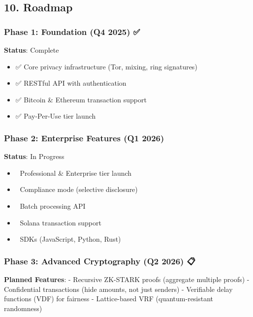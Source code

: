 \documentclass[
  11pt,
]{article}
\providecommand{\tightlist}{%
  \setlength{\itemsep}{0pt}\setlength{\parskip}{0pt}}
\begin{document}
\hypertarget{roadmap}{%
\subsection{10. Roadmap}\label{roadmap}}

\hypertarget{phase-1-foundation-q4-2025}{%
\subsubsection{Phase 1: Foundation (Q4 2025)
✅}\label{phase-1-foundation-q4-2025}}

\textbf{Status}: Complete

\begin{itemize}
\tightlist
\item
  ✅ Core privacy infrastructure (Tor, mixing, ring signatures)
\item
  ✅ RESTful API with authentication
\item
  ✅ Bitcoin \& Ethereum transaction support
\item
  ✅ Pay-Per-Use tier launch
\end{itemize}

\hypertarget{phase-2-enterprise-features-q1-2026}{%
\subsubsection{Phase 2: Enterprise Features (Q1 2026)
🔄}\label{phase-2-enterprise-features-q1-2026}}

\textbf{Status}: In Progress

\begin{itemize}
\tightlist
\item
  🔄 Professional \& Enterprise tier launch
\item
  🔄 Compliance mode (selective disclosure)
\item
  🔄 Batch processing API
\item
  🔄 Solana transaction support
\item
  🔄 SDKs (JavaScript, Python, Rust)
\end{itemize}

\hypertarget{phase-3-advanced-cryptography-q2-2026}{%
\subsubsection{Phase 3: Advanced Cryptography (Q2 2026)
📋}\label{phase-3-advanced-cryptography-q2-2026}}

\textbf{Planned Features}: - Recursive ZK-STARK proofs (aggregate
multiple proofs) - Confidential transactions (hide amounts, not just
senders) - Verifiable delay functions (VDF) for fairness - Lattice-based
VRF (quantum-resistant randomness)
\end{document}
